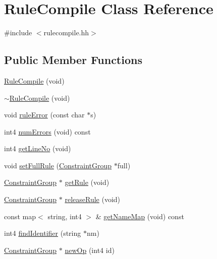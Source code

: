 \hypertarget{class_rule_compile}{}\section{Rule\+Compile Class Reference}
\label{class_rule_compile}


{\ttfamily \#include $<$rulecompile.\+hh$>$}

\subsection*{Public Member Functions}
\begin{DoxyCompactItemize}
\item 
\mbox{\hyperlink{class_rule_compile_a7e3f15cb6cdf4b3cd5a36e1e37447200}{Rule\+Compile}} (void)
\item 
\mbox{\hyperlink{class_rule_compile_a65af0c854d587caf4db20bf38bad8b36}{$\sim$\+Rule\+Compile}} (void)
\item 
void \mbox{\hyperlink{class_rule_compile_ad0760d49eda50a9551f31aa97448bb1b}{rule\+Error}} (const char $\ast$s)
\item 
int4 \mbox{\hyperlink{class_rule_compile_a7bcbc0231f0c9110abcbf84dd3ebfdde}{num\+Errors}} (void) const
\item 
int4 \mbox{\hyperlink{class_rule_compile_ae6102d7e485017165cdd2333000421d4}{get\+Line\+No}} (void)
\item 
void \mbox{\hyperlink{class_rule_compile_a5ccc1ddf66ab1cf55260f990e08afed5}{set\+Full\+Rule}} (\mbox{\hyperlink{class_constraint_group}{Constraint\+Group}} $\ast$full)
\item 
\mbox{\hyperlink{class_constraint_group}{Constraint\+Group}} $\ast$ \mbox{\hyperlink{class_rule_compile_a7c48f3aef8d9b3f23b9d75dffe6c17d2}{get\+Rule}} (void)
\item 
\mbox{\hyperlink{class_constraint_group}{Constraint\+Group}} $\ast$ \mbox{\hyperlink{class_rule_compile_a2bb6af56107e7650098501eb07c781b7}{release\+Rule}} (void)
\item 
const map$<$ string, int4 $>$ \& \mbox{\hyperlink{class_rule_compile_a0d39f7eaaaa68df15841953c7d41b2e9}{get\+Name\+Map}} (void) const
\item 
int4 \mbox{\hyperlink{class_rule_compile_a8dbf0ff983dd5ddc3aecf4e581950613}{find\+Identifier}} (string $\ast$nm)
\item 
\mbox{\hyperlink{class_constraint_group}{Constraint\+Group}} $\ast$ \mbox{\hyperlink{class_rule_compile_ab895d216723fb6395c91605265475b35}{new\+Op}} (int4 id)

\end{DoxyCompactItemize}
